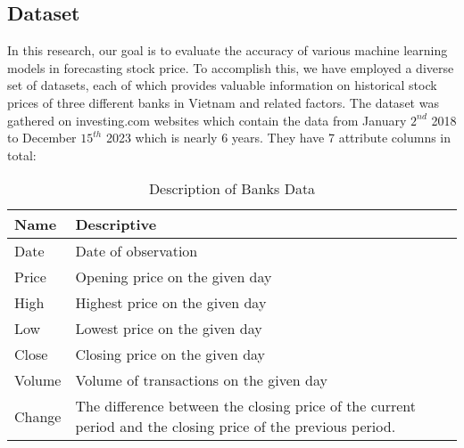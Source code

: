 \documentclass{ieeeojies}
\begin{document}
\subsection{Dataset}
In this research, our goal is to evaluate the accuracy of various
machine learning models in forecasting stock price.
To accomplish this, we have employed a diverse set of datasets,
each of which provides valuable information on historical
stock prices of three different banks in Vietnam and related factors. The dataset
was gathered on investing.com websites which contain the data from January $2^{nd}$ 2018 to December $15^{th}$ 2023 which is nearly 6 years. They have 7 attribute
columns in total:
\renewcommand{\arraystretch}{1.5} %
\begin{table}[h]
\begin{tabular}{|l|p{6cm}|}
\hline
Name   & Descriptive                             \\ \hline
Date   & Date of observation                     \\ \hline
Price  & Opening price on the given day          \\ \hline
High   & Highest price on the given day          \\ \hline
Low    & Lowest price on the given day           \\ \hline
Close  & Closing price on the given day          \\ \hline
Volume & Volume of transactions on the given day \\ \hline
Change & The difference between the closing price of the current period and the closing price of the previous period. \\ \hline
\end{tabular}
\caption{Description of Banks Data}
\end{table}
\vspace{-5\baselineskip}
\renewcommand{\arraystretch}{2}
\end{document}
